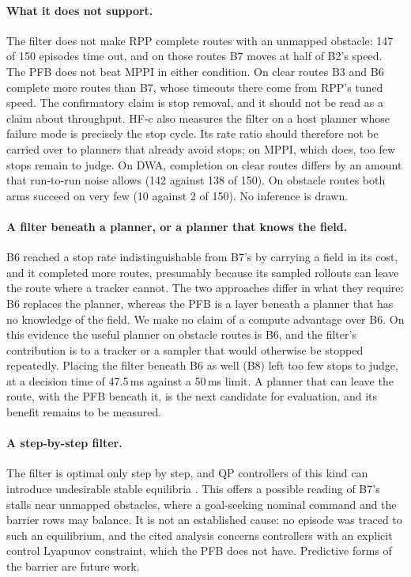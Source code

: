 \documentclass[11pt]{article}
\theoremstyle{definition}
\begin{document}
\paragraph{What it does not support.} The filter does not make RPP complete routes with an unmapped obstacle: 147 of
150 episodes time out, and on those routes B7 moves at half of B2's speed. The PFB does not beat MPPI in either
condition. On clear routes B3 and B6 complete more routes than B7, whose timeouts there come from RPP's tuned speed.
The confirmatory claim is stop removal, and it should not be read as a claim about throughput. HF-c also measures the filter on a host planner whose failure mode is precisely the stop cycle. Its rate ratio should therefore not be carried over to planners that already avoid stops; on MPPI, which does, too few stops remain to judge. On DWA, completion on clear routes differs by an amount that run-to-run noise allows (142 against 138 of 150). On obstacle routes both arms succeed on very few (10 against 2 of 150). No inference is drawn.

\paragraph{A filter beneath a planner, or a planner that knows the field.} B6 reached a stop rate indistinguishable
from B7's by carrying a field in its cost, and it completed more routes, presumably because its sampled rollouts can leave the route where a tracker cannot. The two approaches differ in what they require: B6 replaces the planner, whereas the PFB
is a layer beneath a planner that has no knowledge of the field. We make no claim of a compute advantage over B6. On
this evidence the useful planner on obstacle routes is B6, and the filter's contribution is to a tracker or a sampler
that would otherwise be stopped repeatedly. Placing the filter beneath B6 as well (B8) left too few stops to judge, at a
decision time of 47.5\,ms against a 50\,ms limit. A planner that can leave the route, with the PFB beneath it, is the next candidate for evaluation, and its benefit remains to be measured.

\paragraph{A step-by-step filter.} The filter is optimal only step by step, and QP controllers of this kind can introduce
undesirable stable equilibria \citep[Secs.~3.4 and~6]{garg2024advances}\citep{reis2020undesirable}. This offers a possible
reading of B7's stalls near unmapped obstacles, where a goal-seeking nominal command and the barrier rows may balance. It
is not an established cause: no episode was traced to such an equilibrium, and the cited analysis concerns controllers
with an explicit control Lyapunov constraint, which the PFB does not have. Predictive forms of the barrier
\citep[Sec.~6]{garg2024advances} are future work.
\end{document}
